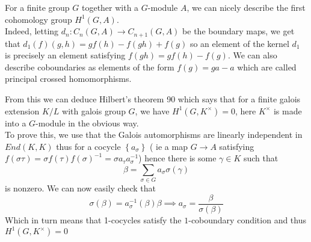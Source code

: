 \documentclass[../main.tex]{subfiles}
\begin{document}
For a finite group $G$ together with a $G$-module $A$, we can nicely describe the first cohomology group $H^{1}( G,A) $.\\
Indeed, letting $d_n: C_n( G,A) \to C_{n+1} ( G,A) $ be the boundary maps, we get that $d_1( f) ( g,h) = g f( h) - f( gh) +f( g) $ so an element of the kernel $d_1$ is precisely an element satisfying $f( gh) = gf( h) - f(g) $.
We can also describe coboundaries as elements of the form $f( g) = ga-a$ which are called principal crossed homomorphisms.

From this we can deduce Hilbert's theorem 90 which says that for a finite galois extension $K/L$ with galois group $G$, we have $H^{1}( G, K^{\times})=0 $, here $K^{\times}$ is made into a $G$-module in the obvious way.\\
To prove this, we use that the Galois automorphisms are linearly independent in $End( K,K) $ thus for a cocycle $ \left\{ a_\sigma \right\} $ ( ie a map $G\to A$ satisfying $f( \sigma\tau) = \sigma f( \tau) f( \sigma)^{-1}= \sigma a_\tau a_\sigma^{-1}$) hence there is some $\gamma\in K$ such that
\[ 
\beta = \sum_{\sigma \in G} a_\sigma \sigma( \gamma) 	
\]
is nonzero. We can now easily check that
\[ 
\sigma( \beta) = a_\sigma^{-1}( \beta) \beta \implies a_\sigma = \frac{\beta}{\sigma( \beta) }
\]
Which in turn means that 1-cocycles satisfy the $1$-coboundary condition and thus $H^{1}( G, K^{\times}) = 0$ 
\end{document}
